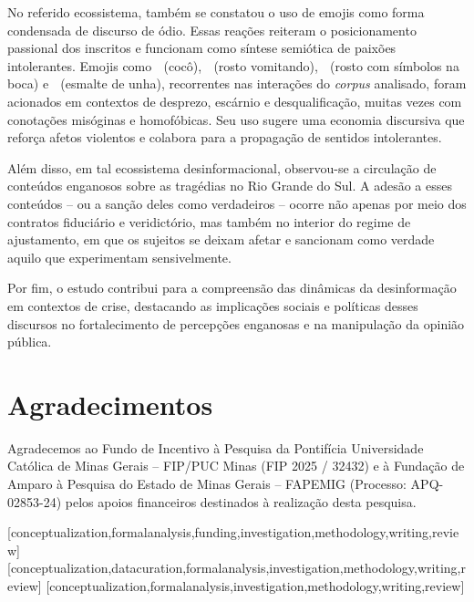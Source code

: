 \documentclass[portuguese]{textolivre}
\begin{document}
No referido ecossistema, também se constatou o uso de emojis como forma condensada de discurso de ódio. Essas reações reiteram o posicionamento passional dos inscritos e funcionam como síntese semiótica de paixões intolerantes. Emojis como {\Symbola 💩} (cocô), {\Symbola 🤮} (rosto vomitando), {\Symbola 🤬} (rosto com símbolos na boca) e {\Symbola 💅} (esmalte de unha), recorrentes nas interações do \textit{corpus} analisado, foram acionados em contextos de desprezo, escárnio e desqualificação, muitas vezes com conotações misóginas e homofóbicas. Seu uso sugere uma economia discursiva que reforça afetos violentos e colabora para a propagação de sentidos intolerantes.

Além disso, em tal ecossistema desinformacional, observou-se a circulação de conteúdos enganosos sobre as tragédias no Rio Grande do Sul. A adesão a esses conteúdos -- ou a sanção deles como verdadeiros -- ocorre não apenas por meio dos contratos fiduciário e veridictório, mas também no interior do regime de ajustamento, em que os sujeitos se deixam afetar e sancionam como verdade aquilo que experimentam sensivelmente. 

Por fim, o estudo contribui para a compreensão das dinâmicas da desinformação em contextos de crise, destacando as implicações sociais e políticas desses discursos no fortalecimento de percepções enganosas e na manipulação da opinião pública.

\section*{Agradecimentos}\label{sec-agradecimentos}
Agradecemos ao Fundo de Incentivo à Pesquisa da Pontifícia Universidade Católica de Minas Gerais -- FIP/PUC Minas (FIP 2025 / 32432) e à Fundação de Amparo à Pesquisa do Estado de Minas Gerais -- FAPEMIG (Processo: APQ-02853-24) pelos apoios financeiros destinados à realização desta pesquisa.


\printbibliography\label{sec-bib}


\begin{contributors}
[conceptualization,formalanalysis,funding,investigation,methodology,writing,review]
[conceptualization,datacuration,formalanalysis,investigation,methodology,writing,review]
[conceptualization,formalanalysis,investigation,methodology,writing,review]
\end{contributors}

\begin{dataavailability}
\end{dataavailability}
\end{document}
